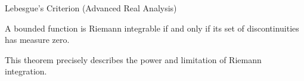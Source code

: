 \documentclass[12pt, a4paper]{article}
\begin{document}
\clearpage

\begin{heading}
Lebesgue's Criterion (Advanced Real Analysis)
\end{heading}

\begin{theorem}
A bounded function is Riemann integrable
if and only if its set of discontinuities has measure zero.
\end{theorem}

This theorem precisely describes the power and limitation of Riemann integration.


\EndPage
\end{document}
